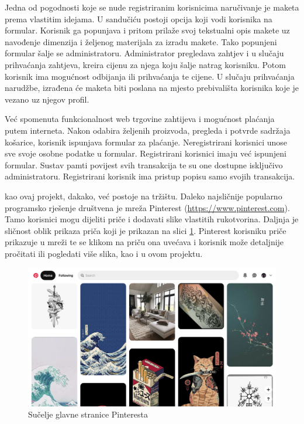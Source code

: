 		Jedna od pogodnosti koje se nude registriranim korisnicima naručivanje je maketa prema vlastitim idejama. U sandučiću postoji opcija koji vodi korisnika na formular. Korisnik ga popunjava i pritom prilaže svoj tekstualni opis makete uz navođenje dimenzija i željenog materijala za izradu makete. Tako popunjeni formular šalje se administratoru. Administrator pregledava zahtjev i u slučaju prihvaćanja zahtjeva, kreira cijenu za njega koju šalje natrag korisniku. Potom korisnik ima mogućnost odbijanja ili prihvaćanja te cijene. U slučaju prihvaćanja narudžbe, izrađena će maketa biti poslana na mjesto prebivališta korisnika koje je vezano uz njegov profil.
		
		Već spomenuta funkcionalnost web trgovine zahtijeva i mogućnost plaćanja putem interneta. Nakon odabira željenih proizvoda, pregleda i potvrde sadržaja košarice, korisnik ispunjava formular za plaćanje. Neregistrirani korisnici unose sve svoje osobne podatke u formular. Registrirani korisnici imaju već ispunjeni formular. Sustav pamti povijest svih transakcija te su one dostupne isključivo administratoru. Registrirani korisnik ima pristup popisu samo svojih transakcija.
		
		 kao ovaj projekt, dakako, već postoje na tržištu. Daleko najsličnije popularno programsko rješenje društvena je mreža Pinterest (\url{https://www.pinterest.com}). Tamo korisnici mogu dijeliti priče i dodavati slike vlastitih rukotvorina. Daljnja je sličnost oblik prikaza priča koji je prikazan na slici \ref{fig:pinterest}. Pinterest korisniku priče prikazuje u mreži te se klikom na priču ona uvećava i korisnik može detaljnije pročitati ili pogledati više slika, kao i u ovom projektu.
		
		\begin{figure}[H]
			\includegraphics[scale=0.32]{slike/pinterest.PNG} %
			\centering
			\caption{Sučelje glavne stranice Pinteresta}
			\label{fig:pinterest}
		\end{figure}
	
